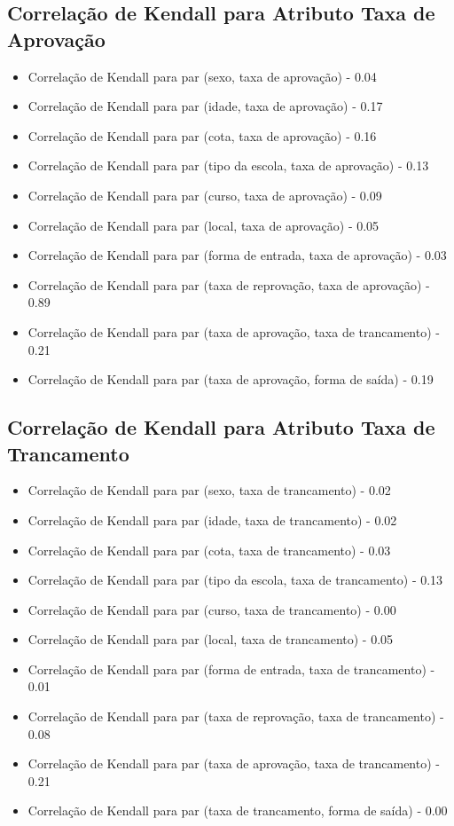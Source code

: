 \subsection{Correlação de Kendall para Atributo Taxa de Aprovação}
\begin{itemize}
    \item Correlação de Kendall para par (sexo, taxa de aprovação) - 0.04
    \item Correlação de Kendall para par (idade, taxa de aprovação) - 0.17
    \item Correlação de Kendall para par (cota, taxa de aprovação) - 0.16
    \item Correlação de Kendall para par (tipo da escola, taxa de aprovação) - 0.13
    \item Correlação de Kendall para par (curso, taxa de aprovação) - 0.09
    \item Correlação de Kendall para par (local, taxa de aprovação) - 0.05
    \item Correlação de Kendall para par (forma de entrada, taxa de aprovação) - 0.03
    \item Correlação de Kendall para par (taxa de reprovação, taxa de aprovação) - 0.89
    \item Correlação de Kendall para par (taxa de aprovação, taxa de trancamento) - 0.21
    \item Correlação de Kendall para par (taxa de aprovação, forma de saída) - 0.19
\end{itemize}

\subsection{Correlação de Kendall para Atributo Taxa de Trancamento}
\begin{itemize}
    \item Correlação de Kendall para par (sexo, taxa de trancamento) - 0.02
    \item Correlação de Kendall para par (idade, taxa de trancamento) - 0.02
    \item Correlação de Kendall para par (cota, taxa de trancamento) - 0.03
    \item Correlação de Kendall para par (tipo da escola, taxa de trancamento) - 0.13
    \item Correlação de Kendall para par (curso, taxa de trancamento) - 0.00
    \item Correlação de Kendall para par (local, taxa de trancamento) - 0.05
    \item Correlação de Kendall para par (forma de entrada, taxa de trancamento) - 0.01
    \item Correlação de Kendall para par (taxa de reprovação, taxa de trancamento) - 0.08
    \item Correlação de Kendall para par (taxa de aprovação, taxa de trancamento) - 0.21
    \item Correlação de Kendall para par (taxa de trancamento, forma de saída) - 0.00
\end{itemize}

